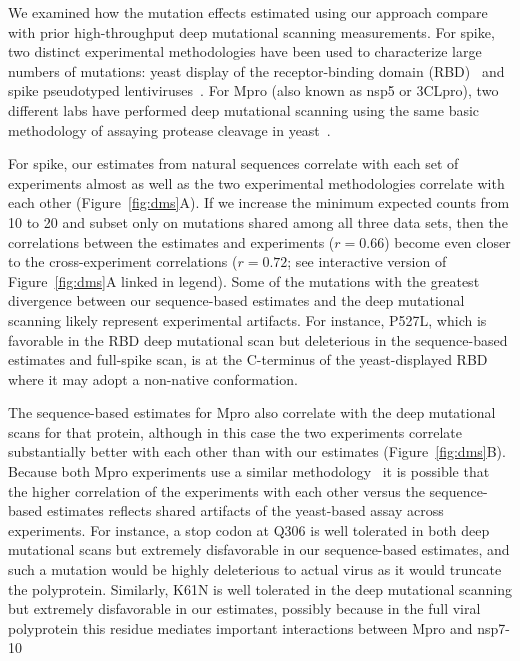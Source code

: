 \documentclass[9pt,twocolumn,twoside]{gsajnl_modified}
\begin{document}
We examined how the mutation effects estimated using our approach compare with prior high-throughput deep mutational scanning measurements.
For spike, two distinct experimental methodologies have been used to characterize large numbers of mutations: yeast display of the receptor-binding domain (RBD)~\citep{starr2020deep,starr2022deep} and spike pseudotyped lentiviruses~\citep{dadonaite2022pseudovirus}.
For Mpro (also known as nsp5 or 3CLpro), two different labs have performed deep mutational scanning using the same basic methodology of assaying protease cleavage in yeast~\citep{flynn2022,iketani2022functional}.

For spike, our estimates from natural sequences correlate with each set of experiments almost as well as the two experimental methodologies correlate with each other (Figure~\ref{fig:dms}A).
If we increase the minimum expected counts from 10 to 20 and subset only on mutations shared among all three data sets, then the correlations between the estimates and experiments ($r = 0.66$) become even closer to the cross-experiment correlations ($r = 0.72$; see interactive version of Figure~\ref{fig:dms}A linked in legend).
Some of the mutations with the greatest divergence between our sequence-based estimates and the deep mutational scanning likely represent experimental artifacts.
For instance, P527L, which is favorable in the RBD deep mutational scan but deleterious in the sequence-based estimates and full-spike scan, is at the C-terminus of the yeast-displayed RBD~\citep{starr2020deep} where it may adopt a non-native conformation.

The sequence-based estimates for Mpro also correlate with the deep mutational scans for that protein, although in this case the two experiments correlate substantially better with each other than with our estimates (Figure~\ref{fig:dms}B).
Because both Mpro experiments use a similar methodology~\citep{flynn2022,iketani2022functional} it is possible that the higher correlation of the experiments with each other versus the sequence-based estimates reflects shared artifacts of the yeast-based assay across experiments.
For instance, a stop codon at Q306 is well tolerated in both deep mutational scans but extremely disfavorable in our sequence-based estimates, and such a mutation would be highly deleterious to actual virus as it would truncate the polyprotein.
Similarly, K61N is well tolerated in the deep mutational scanning but extremely disfavorable in our estimates, possibly because in the full viral polyprotein this residue mediates important interactions between Mpro and nsp7-10~\citep{yadav2022biochemical}
\end{document}
